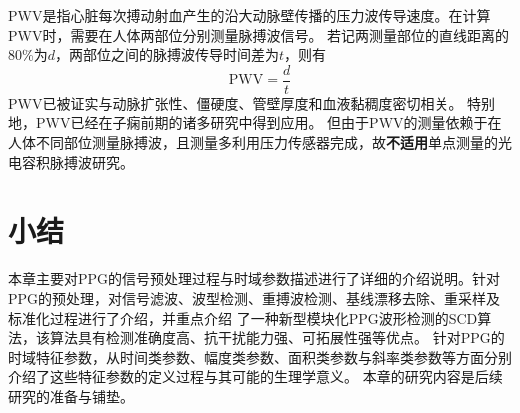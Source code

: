 PWV是指心脏每次搏动射血产生的沿大动脉壁传播的压力波传导速度\cite{Van2012}。在计算PWV时，需要在人体两部位分别测量脉搏波信号。
若记两测量部位的直线距离的80\%为$d$，两部位之间的脉搏波传导时间差为$t$，则有
\begin{equation}
    \label{equ:pwv}
    \text{PWV} = \frac{d}{t}
\end{equation}
PWV已被证实与动脉扩张性、僵硬度、管壁厚度和血液黏稠度密切相关。
特别地，PWV已经在子痫前期的诸多研究中得到应用\cite{Tomsin2012,Katsipi2014,VivianaIvan2018,Ira2014}。
但由于PWV的测量依赖于在人体不同部位测量脉搏波，且测量多利用压力传感器完成，故\textbf{不适用}单点测量的光电容积脉搏波研究。

\section{小结}
本章主要对PPG的信号预处理过程与时域参数描述进行了详细的介绍说明。针对PPG的预处理，对信号滤波、波型检测、重搏波检测、基线漂移去除、重采样及标准化过程进行了介绍，并重点介绍
了一种新型模块化PPG波形检测的SCD算法，该算法具有检测准确度高、抗干扰能力强、可拓展性强等优点。
针对PPG的时域特征参数，从时间类参数、幅度类参数、面积类参数与斜率类参数等方面分别介绍了这些特征参数的定义过程与其可能的生理学意义。
本章的研究内容是后续研究的准备与铺垫。